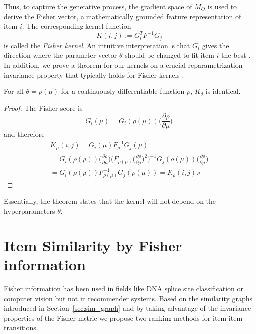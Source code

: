 Thus, to capture the generative process, the gradient space of $M_\Theta$ is used to derive the Fisher vector, a mathematically grounded feature representation of item $i$. The corresponding kernel function 
%
\begin{equation}
K(i,j):= G^T_iF^{-1}G_j
\label{eq:Fisher-kernel}
\end{equation}
%
is called the {\em Fisher kernel}. An intuitive interpretation is that $G_i$ gives the direction where the parameter vector $\theta$ should be changed to fit item $i$ the best \cite{perronnin2007fisher}. In addition, we prove a theorem for our kernels on a crucial reparametrization invariance property that typically holds for Fisher kernels \cite{janke2004information}. 
\begin{theorem}
For all $\theta = \rho(\mu)$ for a continuously differentiable function $\rho$, $K_\theta$ is identical.
\end{theorem}
%
\begin{proof}
The Fisher score is
\begin{equation}
G_i(\mu) = G_i(\rho(\mu)) \bigg(\frac {\partial\rho}{\partial \mu}\bigg) 
\end{equation}
%
and therefore 
%
\begin{gather*}
K_{\mu}(i,j) = G_i(\mu) F_{\mu}^{-1} G_j(\mu) \\ 
= G_i(\rho(\mu)) \bigg(\frac {\partial\rho}{\partial \mu}\bigg) \Bigg(F_{\rho(\mu)} \bigg(\frac {\partial\rho}{\partial \mu}\bigg)^2 \Bigg)^{-1} G_j(\rho(\mu))\bigg(\frac {\partial\rho}{\partial \mu}\bigg) \\
= G_i(\rho(\mu)) F_{\rho(\mu)}^{-1}  G_j(\rho(\mu)) = K_{\rho}(i,j).
\square
\end{gather*}
\end{proof} 

Essentially, the theorem states that the kernel will not depend on the hyperparameters $\theta$.

\section{Item Similarity by Fisher information}
\label{sec:fisher_sim}

Fisher information has been used in fields like DNA splice site classification \cite{JH} or computer vision \cite{perronnin2007fisher} but not in recommender systems. Based on the similarity graphs introduced in Section~\ref{sec:sim_graph} and by taking advantage of the invariance properties of the Fisher metric we propose two ranking methods for item-item transitions.
 
